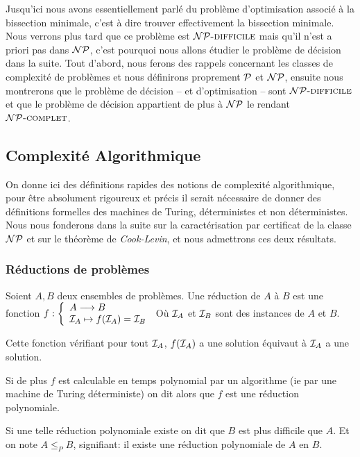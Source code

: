 \documentclass{standalone}
\begin{document}
	
Jusqu'ici nous avons essentiellement parlé du problème d'optimisation associé à la bissection minimale, c'est à dire trouver effectivement la bissection minimale. Nous verrons plus tard que ce problème est $\mathcal{NP}\text{\textsc{-difficile}}$ mais qu'il n'est a priori pas dans $\mathcal{NP}$, c'est pourquoi nous allons étudier le problème de décision dans la suite. Tout d'abord, nous ferons des rappels concernant les classes de complexité de problèmes et nous définirons proprement $\mathcal{P}$ et $\mathcal{NP}$, ensuite nous montrerons que le problème de décision -- et d'optimisation -- sont $\mathcal{NP}\text{\textsc{-difficile}}$ et que le problème de décision appartient de plus à $\mathcal{NP}$ le rendant $\mathcal{NP}\text{\textsc{-complet}}$.

\subsection{Complexité Algorithmique}

On donne ici des définitions rapides des notions de complexité algorithmique, pour être absolument rigoureux et précis il serait nécessaire de donner des définitions formelles des machines de Turing, déterministes et non déterministes. Nous nous fonderons dans la suite sur la caractérisation par certificat de la classe $\mathcal{NP}$ et sur le théorème de \emph{Cook-Levin}\cite{cook}, et nous admettrons ces deux résultats.

\subsubsection{Réductions de problèmes}
\begin{defn}
	Soient $A, B$ deux ensembles de problèmes. Une réduction de $A$ à $B$ est une fonction $f: \left\{ \begin{array}{l}
	A \longrightarrow B \\
	\mathcal I_A \mapsto f(\mathcal I_A) = \mathcal I_B
	\end{array}\right.$
	Où $\mathcal I_A$ et $\mathcal I_B$ sont des instances de $A$ et $B$.
	
	Cette fonction vérifiant pour tout $\mathcal I_A$, $f(\mathcal I_A)$ a une solution équivaut à $\mathcal I_A$ a une solution.
	
	Si de plus $f$ est calculable en temps polynomial par un algorithme (ie par une machine de Turing déterministe) on dit alors que $f$ est une réduction polynomiale.
\end{defn}

\begin{defn}
	Si une telle réduction polynomiale existe on dit que $B$ est plus difficile que $A$. Et on note $A \leq_P B$, signifiant: il existe une réduction polynomiale de $A$ en $B$.
\end{defn}
\end{document}
